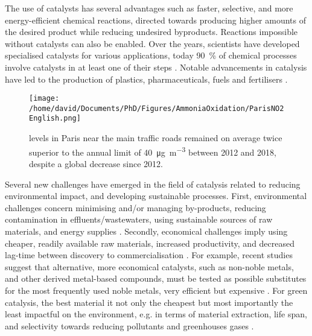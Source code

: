 The use of catalysts has several advantages such as faster, selective, and more energy-efficient chemical reactions, directed towards producing higher amounts of the desired product while reducing undesired byproducts.
Reactions impossible without catalysts can also be enabled.
Over the years, scientists have developed specialised catalysts for various applications, today \qty{90}{\percent} of chemical processes involve catalysts in at least one of their steps \parencite{Weiner1998, DeVries2012}.
Notable advancements in catalysis have led to the production of plastics, pharmaceuticals, fuels and fertilisers \parencite{Fechete2012}.

\begin{figure}[!htb]
    \centering
    \texttt{[image: /home/david/Documents/PhD/Figures/AmmoniaOxidation/ParisNO2English.png]}
    \caption{
         levels in Paris near the main traffic roads remained on average twice superior to the annual limit of \qty{40}{\ug \per \m^3} \parencite{AirParis} between 2012 and 2018, despite a global decrease since 2012.
    }
    \label{fig:NO2Paris}
\end{figure}

Several new challenges have emerged in the field of catalysis related to reducing environmental impact, and developing sustainable processes.
First, environmental challenges concern minimising and/or managing by-products, reducing contamination in effluents/wastewaters, using sustainable sources of raw materials, and energy supplies \parencite{Ludwig2017, Lange2021}.
Secondly, economical challenges imply using cheaper, readily available raw materials, increased productivity, and decreased lag-time between discovery to commercialisation \parencite{Keisuke2019, Gunay2021}.
For example, recent studies suggest that alternative, more economical catalysts, such as non-noble metals, and other derived metal-based compounds, must be tested as possible substitutes for the most frequently used noble metals, very efficient but expensive \parencite{Zhong2021, Ruan2022}.
For green catalysis, the best material it not only the cheapest but most importantly the least impactful on the environment, e.g. in terms of material extraction, life span, and selectivity towards reducing pollutants and greenhouses gases \parencite{Lange2021}.

